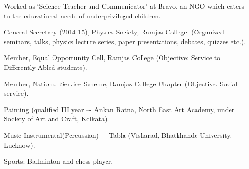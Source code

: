 \begin{itemize}[noitemsep]
{
\item Worked as `Science Teacher and Communicator' at Bravo, an NGO which caters to the educational needs of underprivileged children.
\item General Secretary (2014-15), Physics Society, Ramjas College. (Organized seminars, talks, physics lecture series, paper presentations, debates, quizzes etc.).
\item Member, Equal Opportunity Cell, Ramjas College (Objective: Service to Differently Abled students).
\item Member, National Service Scheme, Ramjas College Chapter (Objective: Social service).
\item Painting (qualified III year –- Ankan Ratna, North East Art Academy, under Society of Art and Craft, Kolkata).
\item Music Instrumental(Percussion) –- Tabla (Visharad, Bhatkhande University, Lucknow).
\item Sports: Badminton and chess player.
}
\end{itemize}